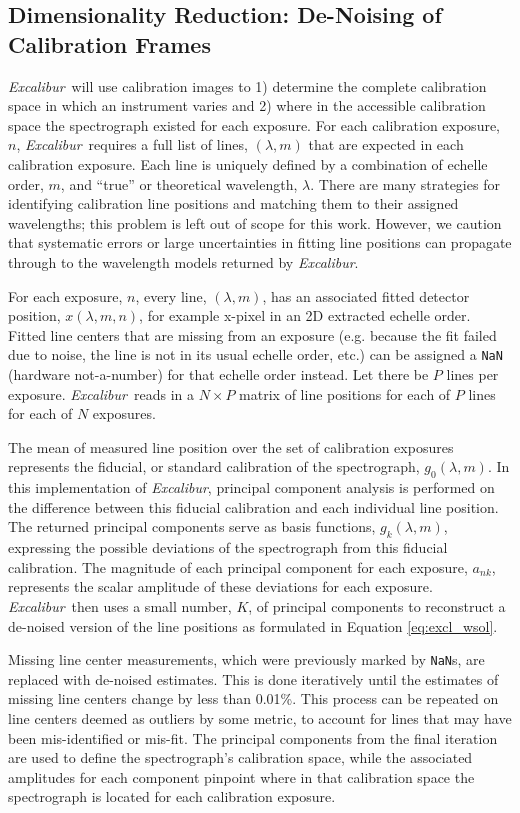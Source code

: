 \documentclass[modern]{aastex63}
\newcommand{\project}[1]{\textsl{#1}}
\newcommand{\name}{\project{Excalibur}}
\newcommand{\code}[1]{\texttt{#1}}
\begin{document}
\subsection{Dimensionality Reduction: De-Noising of Calibration Frames} \label{sec:denoising}
\name\ will use calibration images to  1) determine the complete calibration space in which an instrument varies and 2) where in the accessible calibration space the spectrograph existed for each exposure.  For each calibration exposure, $n$, \name\ requires a full list of lines, $(\lambda,m)$ that are expected in each calibration exposure.  Each line is uniquely defined by a combination of echelle order, $m$, and ``true'' or theoretical wavelength, $\lambda$.  There are many strategies for identifying calibration line positions and matching them to their assigned wavelengths; this problem is left out of scope for this work.  However, we caution that systematic errors or large uncertainties in fitting line positions can propagate through to the wavelength models returned by \name.

For each exposure, $n$, every line, $(\lambda,m)$, has an associated fitted detector position, $x(\lambda,m,n)$, for example x-pixel in an 2D extracted echelle order.  Fitted line centers that are missing from an exposure (e.g. because the fit failed due to noise, the line is not in its usual echelle order, etc.) can be assigned a \code{NaN} (hardware not-a-number) for that echelle order instead.  Let there be $P$ lines per exposure.  \name\ reads in a $N \times P$ matrix of line positions for each of $P$ lines for each of $N$ exposures.

The mean of measured line position over the set of calibration exposures represents the fiducial, or standard calibration of the spectrograph, $g_0(\lambda,m)$.  In this implementation of \name, principal component analysis is performed on the difference between this fiducial calibration and each individual line position.  The returned principal components serve as basis functions,  $g_k(\lambda,m)$, expressing the possible deviations of the spectrograph from this fiducial calibration.  The magnitude of each principal component for each exposure, $a_{nk}$, represents the scalar amplitude of these deviations for each exposure.  \name\ then uses a small number, $K$, of principal components to reconstruct a de-noised version of the line positions as formulated in Equation \ref{eq:excl_wsol}.

Missing line center measurements, which were previously marked by \code{NaN}s, are replaced with de-noised estimates.  This is done iteratively until the estimates of missing line centers change by less than 0.01\%.  This process can be repeated on line centers deemed as outliers by some metric, to account for lines that may have been mis-identified or mis-fit.  The principal components from the final iteration are used to define the spectrograph's calibration space, while the associated amplitudes for each component pinpoint where in that calibration space the spectrograph is located for each calibration exposure.
\end{document}
